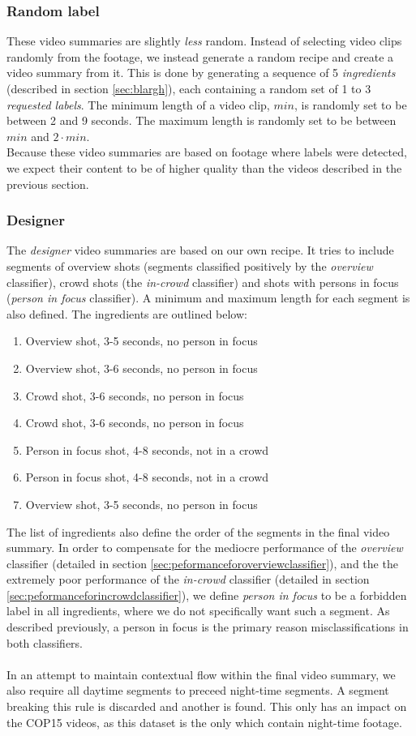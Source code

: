 \subsubsection{Random label}
%
These video summaries are slightly \textit{less} random. Instead of selecting video clips randomly from the footage, we instead generate a random recipe and create a video summary from it. This is done by generating a sequence of 5 \textit{ingredients} (described in section \ref{sec:blargh}), each containing a random set of 1 to 3 \textit{requested labels}. The minimum length of a video clip, $min$, is randomly set to be between 2 and 9 seconds. The maximum length is randomly set to be between $min$ and $2 \cdot min$.\\
Because these video summaries are based on footage where labels were detected, we expect their content to be of higher quality than the videos described in the previous section.
%
\subsubsection{Designer}\label{sec:phase4designer}
%
The \textit{designer} video summaries are based on our own recipe. It tries to include segments of overview shots (segments classified positively by the \textit{overview} classifier), crowd shots (the \textit{in-crowd} classifier) and shots with persons in focus (\textit{person in focus} classifier). A minimum and maximum length for each segment is also defined. The ingredients are outlined below:
%
\begin{enumerate}
\item Overview shot, 3-5 seconds, no person in focus
\item Overview shot, 3-6 seconds, no person in focus
\item Crowd shot, 3-6 seconds, no person in focus
\item Crowd shot, 3-6 seconds, no person in focus
\item Person in focus shot, 4-8 seconds, not in a crowd
\item Person in focus shot, 4-8 seconds, not in a crowd
\item Overview shot, 3-5 seconds, no person in focus
\end{enumerate}
%
The list of ingredients also define the order of the segments in the final video summary. In order to compensate for the mediocre performance of the \textit{overview} classifier (detailed in section \ref{sec:peformanceforoverviewclassifier}), and the the extremely poor performance of the \textit{in-crowd} classifier (detailed in section \ref{sec:peformanceforincrowdclassifier}), we define \textit{person in focus} to be a forbidden label in all ingredients, where we do not specifically want such a segment. As described previously, a person in focus is the primary reason misclassifications in both classifiers.\\
\\
In an attempt to maintain contextual flow within the final video summary, we also require all daytime segments to preceed night-time segments. A segment breaking this rule is discarded and another is found. This only has an impact on the COP15 videos, as this dataset is the only which contain night-time footage.
%
